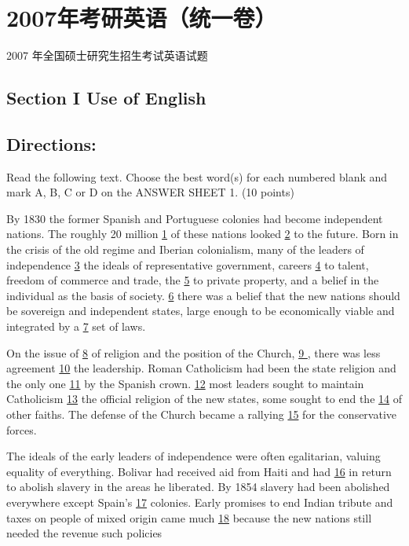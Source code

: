 \documentclass[UTF8,11pt]{ctexart}
\begin{document}
\section*{2007年考研英语（统一卷）}
2007 年全国硕士研究生招生考试英语试题


\subsection*{\textbf{Section I Use of English}}


\subsection*{\textbf{Directions:}}


Read the following text. Choose the best word(s) for each numbered blank and mark A, B, C or D on the ANSWER SHEET 1. (10 points)


By 1830 the former Spanish and Portuguese colonies had become independent nations. The roughly 20 million \uline{1} of these nations looked \uline{2} to the future. Born in the crisis of the old regime and Iberian colonialism, many of the leaders of independence \uline{3} the ideals of representative government, careers \uline{4} to talent, freedom of commerce and trade, the \uline{5} to private property, and a belief in the individual as the basis of society. \uline{6} there was a belief that the new nations should be sovereign and independent states, large enough to be economically viable and integrated by a \uline{7} set of laws.


On the issue of \uline{8} of religion and the position of the Church, \uline{9 }, there was less agreement \uline{10} the leadership. Roman Catholicism had been the state religion and the only one \uline{11} by the Spanish crown. \uline{12} most leaders sought to maintain Catholicism \uline{13} the official religion of the new states, some sought to end the \uline{14} of other faiths. The defense of the Church became a rallying \uline{15} for the conservative forces.


The ideals of the early leaders of independence were often egalitarian, valuing equality of everything. Bolivar had received aid from Haiti and had \uline{16} in return to abolish slavery in the areas he liberated. By 1854 slavery had been abolished everywhere except Spain’s \uline{17} colonies. Early promises to end Indian tribute and taxes on people of mixed origin came much \uline{18} because the new nations still needed the revenue such policies
\end{document}
